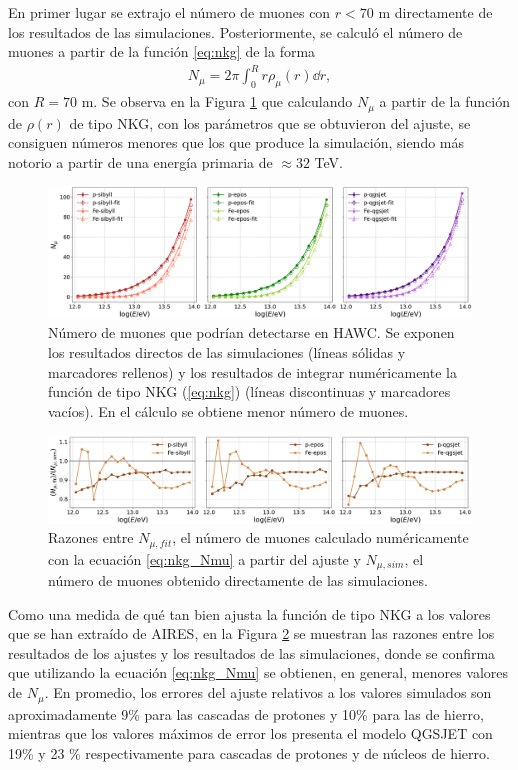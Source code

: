 En primer lugar se extrajo el n\'umero de muones con $r<70$ m directamente de los resultados de las simulaciones. Posteriormente, se calcul\'o el n\'umero de muones a partir de la funci\'on \ref{eq:nkg} de la forma
	\begin{align} \label{eq:nkg_Nmu}
	N_{\mu} = 2 \pi \int_0^R r \rho_{\mu}(r) \dd{r},
	\end{align}
con $R=70$ m. Se observa en la Figura \ref{fig:munumbers} que calculando $N_{\mu}$ a partir de la funci\'on de $\rho(r)$ de tipo NKG, con los par\'ametros que se obtuvieron del ajuste, se consiguen n\'umeros menores que los que produce la simulaci\'on, siendo m\'as notorio a partir de una energ\'ia primaria de $\approx 32$ TeV.\\	
	\begin{figure} []
	\includegraphics[width=\textwidth]{Figuras/munumbers}
	\caption{N\'umero de muones que podr\'ian detectarse en HAWC. Se exponen los resultados directos de las simulaciones (l\'ineas s\'olidas y marcadores rellenos) y los resultados de integrar num\'ericamente la funci\'on de tipo NKG (\ref{eq:nkg}) (l\'ineas discontinuas y marcadores vac\'ios). En el c\'alculo se obtiene menor n\'umero de muones.}
	\label{fig:munumbers}
	\end{figure}
	
	\begin{figure} []
	\includegraphics[width=\textwidth]{Figuras/munumbers_ratios}
	\caption{Razones entre $N_{\mu,fit}$, el n\'umero de muones  calculado num\'ericamente con la ecuaci\'on \ref{eq:nkg_Nmu} a partir del ajuste y $N_{\mu,sim}$, el n\'umero de muones obtenido directamente de las simulaciones.}
	\label{fig:munumbers_ratios}
	\end{figure}
	
Como una medida de qu\'e tan bien ajusta la funci\'on de tipo NKG a los valores que se han extra\'ido de AIRES, en la Figura \ref{fig:munumbers_ratios} se muestran las razones entre los resultados de los ajustes y los resultados de las simulaciones, donde se confirma que utilizando la ecuaci\'on \ref{eq:nkg_Nmu} se obtienen, en general, menores valores de $N_{\mu}$. En promedio, los errores del ajuste relativos a los valores simulados son aproximadamente 9\% para las cascadas de protones y 10\% para las de hierro, mientras que los valores m\'aximos de error los presenta el modelo QGSJET con 19\% y 23 \%  respectivamente para cascadas de protones y de n\'ucleos de hierro.
	
\singlespacing